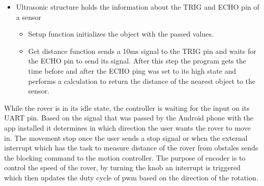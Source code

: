 \begin{itemize}
\begin{itemize}
    \end{itemize}
    \item Ultrasonic structure holds the information about the TRIG and ECHO pin of a sensor
    \begin{itemize}
        \item Setup function initializes the object with the passed values.
        \item Get distance function sends a 10ms signal to the TRIG pin and waits for the ECHO pin to send its signal. After this step the program gets the time before and after the ECHO ping was set to its high state and performs a calculation to return the distance of the nearest object to the sensor.
    \end{itemize}
\end{itemize}

While the rover is in its idle state, the controller is waiting for the input on its UART pin. Based on the signal that was passed by the Android phone with the app installed it determines in which direction the user wants the rover to move in. The movement stop once the user sends a stop signal or when the external interrupt which has the task to measure distance of the rover from obstales sends the blocking command to the motion controller. The purpose of encoder is to control the speed of the rover, by turning the knob an interrupt is triggered which then updates the duty cycle of pwm based on the direction of the rotation. 